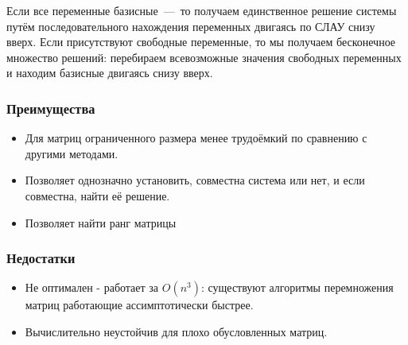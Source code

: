 \documentclass[12pt,a4paper,oneside]{extarticle}
\begin{document}
\begin{enumerate}
                Если все переменные базисные~---~то получаем единственное решение системы путём последовательного нахождения переменных двигаясь по СЛАУ снизу вверх. Если присутствуют свободные переменные, то мы получаем бесконечное множество решений: перебираем всевозможные значения свободных переменных и находим базисные двигаясь снизу вверх.
        \end{enumerate}

        \subsubsection{Преимущества}
            \begin{itemize}
                \item Для матриц ограниченного размера менее трудоёмкий по сравнению с другими методами.
                \item Позволяет однозначно установить, совместна система или нет, и если совместна, найти её решение.
                \item Позволяет найти ранг матрицы
            \end{itemize}
        \subsubsection{Недостатки}
            \begin{itemize}
                \item Не оптимален - работает за $O(n^3)$: существуют алгоритмы перемножения матриц работающие ассимптотически быстрее.
                \item Вычислительно неустойчив для плохо обусловленных матриц.
            \end{itemize}
\end{document}
